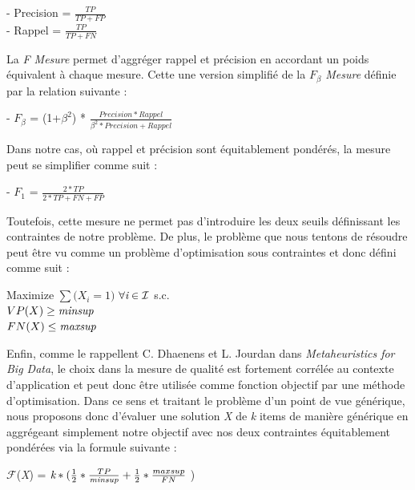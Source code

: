 \documentclass[a4paper,10pt]{report}
\begin{document}
\begin{center}
- Precision = $\frac{TP}{TP+FP}$ \\
\vspace{0.15cm}
- Rappel = $\frac{TP}{TP+FN}$\\
\end{center}

La \emph{F Mesure} permet d'aggréger rappel et précision en accordant un poids équivalent à chaque mesure. Cette une version simplifié de la \emph{$F_{\beta}$ Mesure} définie par la relation suivante : 
\begin{center}
- \emph{$F_{\beta}$} = (1+$\beta^{2}$) * $\frac{Precision*Rappel}{\beta^{2}*Precision + Rappel}$
\end{center}

Dans notre cas, où rappel et précision sont équitablement pondérés, la mesure peut se simplifier comme suit :

\begin{center}
- \emph{$F_{1}$} = $\frac{2*TP}{2*TP + FN + FP }$
\end{center}

Toutefois, cette mesure ne permet pas d'introduire les deux seuils définissant les contraintes de notre problème. De plus, le problème que nous tentons de résoudre peut être vu comme un problème d'optimisation sous contraintes et donc défini comme suit : \\

\begin{center}
	Maximize $\sum{(X_{i} = 1})$ $\forall \emph{i} \in \mathcal{I}$ s.c. \\
	$VP(X) \geq \emph{minsup}$ \\
	$FN(X) \leq \emph{maxsup}$
\end{center}

Enfin, comme le rappellent C. Dhaenens et L. Jourdan dans \emph{Metaheuristics for Big Data}, le choix dans la mesure de qualité est fortement corrélée au contexte d'application et peut donc être utilisée comme fonction objectif par une méthode d'optimisation. Dans ce sens et traitant le problème d'un point de vue générique, nous proposons donc d'évaluer une solution \emph{X} de \emph{k} items de manière générique en aggrégeant simplement notre objectif avec nos deux contraintes équitablement pondérées via la formule suivante :

\begin{center}
	$\mathcal{F}$(\emph{X}) = $\emph{k}* ( \frac{1}{2}*\frac{TP}{\emph{minsup}} + \frac{1}{2}*\frac{maxsup}{FN}$ )\\
\end{center}
\end{document}
